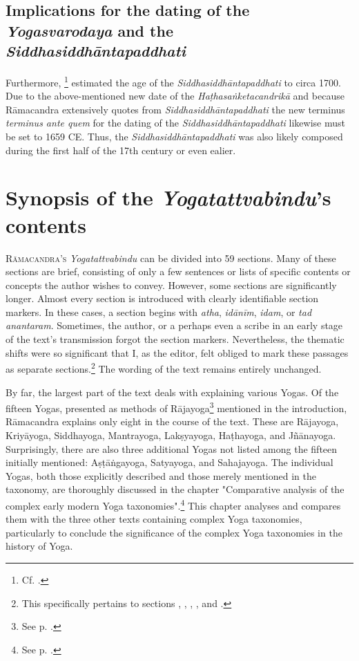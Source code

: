 
\subsection{Implications for the dating of the \textit{Yogasvarodaya} and the \textit{Siddhasiddhāntapaddhati}}
Furthermore, \citeauthor{mallinsononline2013}\footnote{Cf. .} estimated the age of the \textit{Siddhasiddhāntapaddhati} to circa 1700. Due to the above-mentioned new date of the \textit{Haṭhasaṅketacandrikā} and because Rāmacandra extensively quotes from \textit{Siddhasiddhāntapaddhati} the new terminus \textit{terminus ante quem} for the dating of the \textit{Siddhasiddhāntapaddhati} likewise must be set to 1659 CE. Thus, the \textit{Siddhasiddhāntapaddhati} was also likely composed during the first half of the 17th century or even ealier.

\section{Synopsis of the \emph{Yogatattvabindu}'s contents}

\lettrine[lines=2, lhang=0.2, loversize=0.25]{R}{āmacandra's} \emph{Yogatattvabindu} can be divided into 59 sections. Many of these sections are brief, consisting of only a few sentences or lists of specific contents or concepts the author wishes to convey. However, some sections are significantly longer. Almost every section is introduced with clearly identifiable section markers. In these cases, a section begins with \textit{atha}, \textit{idānīm}, \textit{idam}, or \textit{tad anantaram}. Sometimes, the author, or a perhaps even a scribe in an early stage of the text's transmission forgot the section markers. Nevertheless, the thematic shifts were so significant that I, as the editor, felt obliged to mark these passages as separate sections.\footnote{This specifically pertains to sections , , , , and .} The wording of the text remains entirely unchanged.

By far, the largest part of the text deals with explaining various Yogas. Of the fifteen Yogas, presented as methods of Rājayoga\footnote{See p. \pageref{into}.} mentioned in the introduction, Rāmacandra explains only eight in the course of the text. These are Rājayoga, Kriyāyoga, Siddhayoga, Mantrayoga, Lakṣyayoga, Haṭhayoga, and Jñānayoga. Surprisingly, there are also three additional Yogas not listed among the fifteen initially mentioned: Aṣṭāṅgayoga, Satyayoga, and Sahajayoga. The individual Yogas, both those explicitly described and those merely mentioned in the taxonomy, are thoroughly discussed in the chapter "Comparative analysis of the complex early modern Yoga taxonomies".\footnote{See p. \pageref{yogatax}.} This chapter analyses and compares them with the three other texts containing complex Yoga taxonomies, particularly to conclude the significance of the complex Yoga taxonomies in the history of Yoga.

